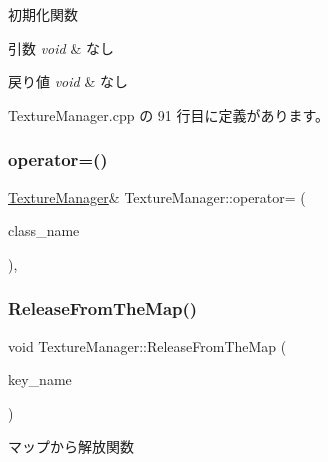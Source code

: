初期化関数 


\begin{DoxyParams}{引数}
{\em void} & なし \\
\hline
\end{DoxyParams}

\begin{DoxyRetVals}{戻り値}
{\em void} & なし \\
\hline
\end{DoxyRetVals}


 Texture\+Manager.\+cpp の 91 行目に定義があります。

\mbox{\label{class_texture_manager_a3f13712c65812a9053852165a9a67824}} 
\subsubsection{\texorpdfstring{operator=()}{operator=()}}
{\footnotesize\ttfamily \mbox{\hyperlink{class_texture_manager}{Texture\+Manager}}\& Texture\+Manager\+::operator= (\begin{DoxyParamCaption}\item[{const \mbox{\hyperlink{class_texture_manager}{Texture\+Manager}} \&}]{class\+\_\+name }\end{DoxyParamCaption})\hspace{0.3cm}{\ttfamily [private]}, {\ttfamily [delete]}}

\mbox{\label{class_texture_manager_aa95379c1144d0cf1bbff438709ba72e8}} 
\subsubsection{\texorpdfstring{Release\+From\+The\+Map()}{ReleaseFromTheMap()}}
{\footnotesize\ttfamily void Texture\+Manager\+::\+Release\+From\+The\+Map (\begin{DoxyParamCaption}\item[{std\+::string $\ast$}]{key\+\_\+name }\end{DoxyParamCaption})}



マップから解放関数 


